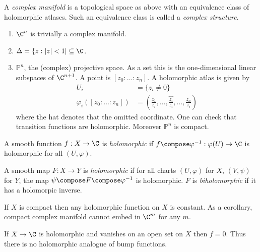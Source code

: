 \documentclass[a4paper]{article}
\renewcommand{\P}{\mathbb P} %
\begin{document}
\begin{definition}
  A \emph{complex manifold} is a topological space as above with an equivalence class of holomorphic atlases. Such an equivalence class is called a \emph{complex structure}.
\end{definition}

\begin{eg}\leavevmode
  \begin{enumerate}
  \item \(\C^n\) is trivially a complex manifold.
  \item \(\Delta = \{z: |z| < 1| \subseteq \C\).
  \item \(\P^n\), the (complex) projective space. As a set this is the one-dimensional linear subspaces of \(\C^{n + 1}\). A point is \([z_0: \dots: z_n]\). A holomorphic atlas is given by
    \begin{align*}
      U_i &= \{z_i \neq 0\} \\
      \varphi_i([z_0: \dots:z_n]) &= (\frac{z_1}{z_i}, \dots, \hat{\frac{z_i}{z_i}}, \dots, \frac{z_n}{z_i})
    \end{align*}
    where the hat denotes that the omitted coordinate. One can check that transition functions are holomorphic. Moreover \(\P^n\) is compact.
  \end{enumerate}
\end{eg}

\begin{definition}
  A smooth function \(f: X \to \C\) is \emph{holomorphic} if \(f \compose \varphi^{-1}: \varphi(U) \to \C\) is holomorphic for all \((U, \varphi)\).

  A smooth map \(F: X \to Y\) is \emph{holomorphic} if for all charts \((U, \varphi)\) for \(X\), \((V, \psi)\) for \(Y\), the map \(\psi \compose F \compose \varphi^{-1}\) is holomorphic. \(F\) is \emph{biholomorphic} if it has a holomorpic inverse.
\end{definition}

\begin{ex}
  If \(X\) is compact then any holomorphic function on \(X\) is constant. As a corollary, compact complex manifold cannot embed in \(\C^m\) for any \(m\).
\end{ex}

\begin{ex}
  If \(X \to \C\) is holomorphic and vanishes on an open set on \(X\) then \(f = 0\). Thus there is no holomorphic analogue of bump functions.
\end{ex}
\end{document}
